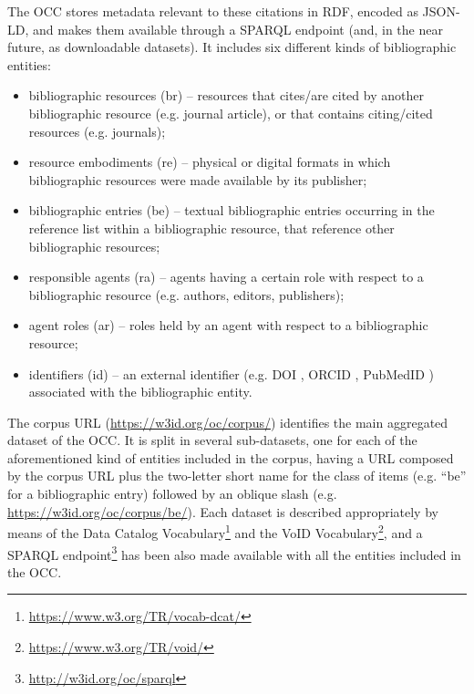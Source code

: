\documentclass[runningheads,a4paper]{llncs}
\begin{document}
The OCC stores metadata relevant to these citations in RDF, encoded as JSON-LD, and makes them available through a SPARQL endpoint (and, in the near future, as downloadable datasets). It includes six different kinds of bibliographic entities:
\begin{itemize}
\item bibliographic resources (br) -- resources that cites/are cited by another bibliographic resource (e.g. journal article), or that contains citing/cited resources (e.g. journals);
\item resource embodiments (re) -- physical or digital formats in which bibliographic resources were made available by its publisher;
\item bibliographic entries (be) -- textual bibliographic entries occurring in the reference list within a bibliographic resource, that reference other bibliographic resources;
\item responsible agents (ra) -- agents having a certain role with respect to a bibliographic resource (e.g. authors, editors, publishers);
\item agent roles (ar) -- roles held by an agent with respect to a bibliographic resource;
\item identifiers (id) -- an external identifier (e.g. DOI , ORCID , PubMedID ) associated with the bibliographic entity.
\end{itemize}

The corpus URL (\url{https://w3id.org/oc/corpus/}) identifies the main aggregated dataset of the OCC. It is split in several sub-datasets, one for each of the aforementioned kind of entities included in the corpus, having a URL composed by the corpus URL plus the two-letter short name for the class of items (e.g. ``be'' for a bibliographic entry) followed by an oblique slash (e.g. \url{https://w3id.org/oc/corpus/be/}). Each dataset is described appropriately by means of the Data Catalog Vocabulary\footnote{\url{https://www.w3.org/TR/vocab-dcat/}} and the VoID Vocabulary\footnote{\url{https://www.w3.org/TR/void/}}, and a SPARQL endpoint\footnote{\url{http://w3id.org/oc/sparql}} has been also made available with all the entities included in the OCC.
\end{document}
